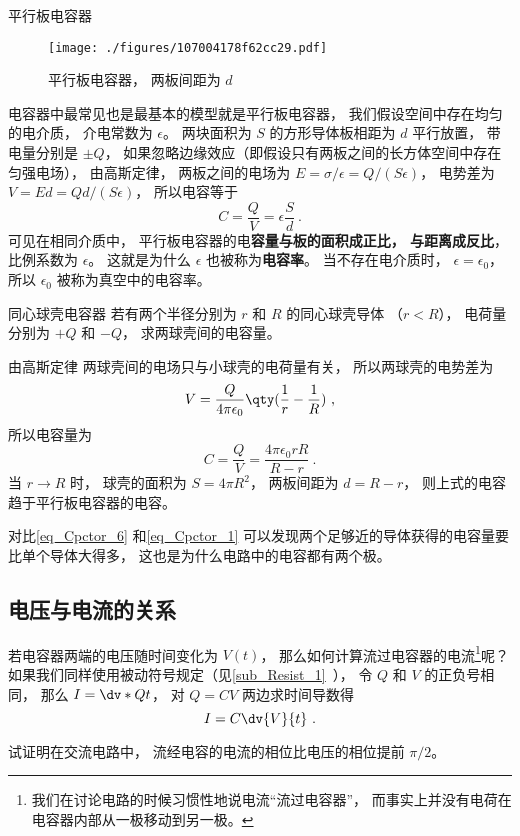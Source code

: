 \begin{example}{平行板电容器}\label{ex_Cpctor_2}
\begin{figure}[ht]
\centering
\texttt{[image: ./figures/107004178f62cc29.pdf]}
\caption{平行板电容器， 两板间距为 $d$} \label{fig_Cpctor_1}
\end{figure}
电容器中最常见也是最基本的模型就是平行板电容器， 我们假设空间中存在均匀的电介质， 介电常数为 $\epsilon$。 两块面积为 $S$ 的方形导体板相距为 $d$ 平行放置， 带电量分别是 $\pm Q$， 如果忽略边缘效应（即假设只有两板之间的长方体空间中存在匀强电场）， 由高斯定律，%
两板之间的电场为 $E = {\sigma}/{\epsilon} = Q/(S\epsilon)$， 电势差为 $V = Ed = Qd/(S\epsilon)$， 所以电容等于
\begin{equation}\label{eq_Cpctor_4}
C = \frac{Q}{V} = \epsilon \frac Sd~.
\end{equation}
可见在相同介质中， 平行板电容器的电\textbf{容量与板的面积成正比， 与距离成反比}， 比例系数为 $\epsilon$。 这就是为什么 $\epsilon$ 也被称为\textbf{电容率}。 当不存在电介质时， $\epsilon = \epsilon_0$， 所以 $\epsilon_0$ 被称为真空中的电容率。
\end{example}

\begin{example}{同心球壳电容器}
若有两个半径分别为 $r$ 和 $R$ 的同心球壳导体 （$r < R$）， 电荷量分别为 $+Q$ 和 $-Q$， 求两球壳间的电容量。

由高斯定律%
两球壳间的电场只与小球壳的电荷量有关， 所以两球壳的电势差为
\begin{equation}
V = \frac{Q}{4\pi\epsilon_0} \qty(\frac 1r - \frac 1R)~,
\end{equation}
所以电容量为
\begin{equation}\label{eq_Cpctor_6}
C = \frac QV = \frac{4\pi\epsilon_0 rR}{R - r}~.
\end{equation}
当 $r\to R$ 时， 球壳的面积为 $S = 4\pi R^2$， 两板间距为 $d = R - r$， 则上式的电容趋于平行板电容器的电容。
\end{example}

对比\autoref{eq_Cpctor_6} 和\autoref{eq_Cpctor_1} 可以发现两个足够近的导体获得的电容量要比单个导体大得多， 这也是为什么电路中的电容都有两个极。

\subsection{电压与电流的关系}
若电容器两端的电压随时间变化为 $V(t)$， 那么如何计算流过电容器的电流\footnote{我们在讨论电路的时候习惯性地说电流“流过电容器”， 而事实上并没有电荷在电容器内部从一极移动到另一极。}呢？ 如果我们同样使用被动符号规定（见\autoref{sub_Resist_1}~）， 令 $Q$ 和 $V$ 的正负号相同， 那么 $I = \dv*{Q}{t}$， 对 $Q = CV$ 两边求时间导数得
\begin{equation}\label{eq_Cpctor_3}
I = C\dv{V}{t}~.
\end{equation}
\begin{exercise}{}
试证明在交流电路中， 流经电容的电流的相位比电压的相位提前 $\pi/2$。
\end{exercise}

